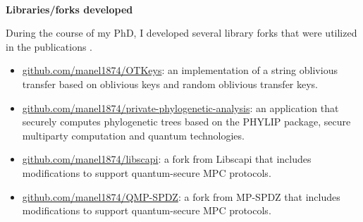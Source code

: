 \

\noindent\textbf{Libraries/forks developed}

\noindent During the course of my PhD, I developed several library forks that were utilized in the publications \cite{SGPM22, SGPM21, TSP23, SP23}.

\begin{itemize}
	\item  \href{https://github.com/manel1874/OTKeys}{github.com/manel1874/OTKeys}: an implementation of a string oblivious transfer based on oblivious keys and random oblivious transfer keys.
	\item  \href{https://github.com/manel1874/private-phylogenetic-analysis}{github.com/manel1874/private-phylogenetic-analysis}: an application that securely computes phylogenetic trees based on the PHYLIP package, secure multiparty computation and quantum technologies.
	\item \href{https://github.com/manel1874/libscapi}{github.com/manel1874/libscapi}: a fork from Libscapi \cite{libscapi} that includes modifications to support quantum-secure MPC protocols.
	\item \href{https://github.com/manel1874/QMP-SPDZ}{github.com/manel1874/QMP-SPDZ}:  a fork from MP-SPDZ \cite{} that includes modifications to support quantum-secure MPC protocols.
\end{itemize}


%
%
%
